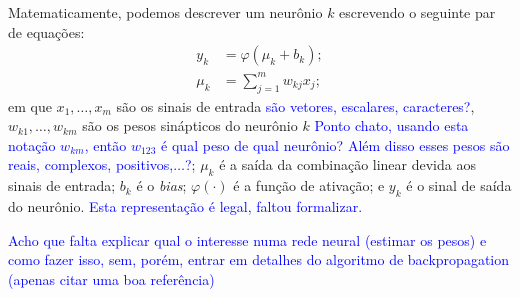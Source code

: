 \documentclass{automatextcc}
\newcommand{\pumi}[1]{\textcolor{blue}{#1}}
\begin{document}
Matematicamente, podemos descrever um neurônio $k$ escrevendo o seguinte par de equações:
\begin{align*}
y_k &= \varphi(\mu_k + b_k);\\[.2cm]
\mu_k &= \displaystyle{\sum_{j=1}^{m} }w_{kj}x_j;
\end{align*}
em que $x_1,\dots,x_m$ são os sinais de entrada \pumi{são vetores, escalares, caracteres?}, $w_{k1},\dots,w_{km}$ são os pesos sinápticos do neurônio $k$ \pumi{Ponto chato, usando esta notação $w_{km}$, então $w_{123}$ é qual peso de qual neurônio? Além disso esses pesos são reais, complexos, positivos,$\ldots$?}; $\mu_k$ é a saída da combinação linear devida aos sinais de entrada; $b_k$ é o \textit{bias}; $\varphi(\cdot)$ é a função de ativação; e $y_k$ é o sinal de saída do neurônio. \pumi{Esta representação é legal, faltou formalizar.}



\pumi{Acho que falta explicar qual o interesse numa rede neural (estimar os pesos) e como fazer isso, sem, porém, entrar em detalhes do algoritmo de backpropagation (apenas citar uma boa referência)}
\end{document}
